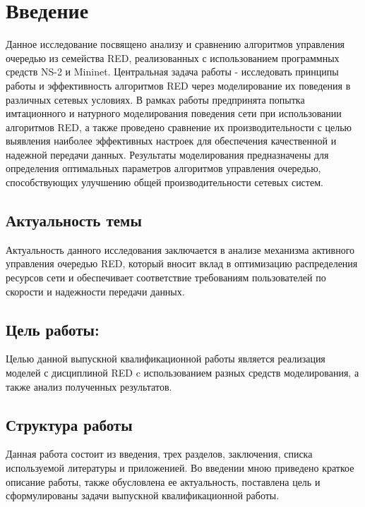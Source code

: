 \chapter*{Введение}

Данное исследование посвящено анализу и сравнению алгоритмов управления очередью из семейства RED, 
реализованных с использованием программных средств NS-2 и Mininet. Центральная задача работы - исследовать 
принципы работы и эффективность алгоритмов RED через моделирование их поведения в различных сетевых условиях. 
В рамках работы предпринята попытка имтационного и натурного моделирования поведения сети при использовании 
алгоритмов RED, а также проведено сравнение их производительности с целью выявления наиболее эффективных настроек 
для обеспечения качественной и надежной передачи данных. Результаты моделирования предназначены для определения 
оптимальных параметров алгоритмов управления очередью, способствующих улучшению общей производительности сетевых систем.

\section*{Актуальность темы}

Актуальность данного исследования заключается в анализе механизма активного управления очередью RED, 
который вносит вклад в оптимизацию распределения ресурсов сети и обеспечивает соответствие требованиям 
пользователей по скорости и надежности передачи данных.

\section*{Цель работы:}

Целью данной выпускной квалификационной работы является реализация моделей с дисциплиной
RED c использованием разных средств моделирования, а также анализ полученных результатов.

\section*{Структура работы}

Данная работа состоит из введения, трех разделов, заключения, списка используемой литературы и приложенией. 
Во введении мною приведено краткое описание работы, также обусловлена ее актуальность, поставлена цель и 
сформулированы задачи выпускной квалификационной работы.

